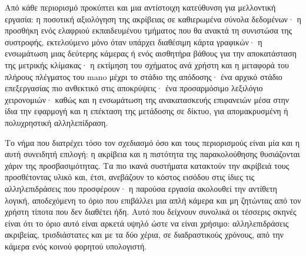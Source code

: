 Από κάθε περιορισμό προκύπτει και μια αντίστοιχη κατεύθυνση για μελλοντική
εργασία: η ποσοτική αξιολόγηση της ακρίβειας σε καθιερωμένα σύνολα δεδομένων· η
προσθήκη ενός ελαφριού εκπαιδευμένου τμήματος που θα ανακτά τη συνιστώσα της
συστροφής, εκτελούμενο μόνο όταν υπάρχει διαθέσιμη κάρτα γραφικών· η ενσωμάτωση
μιας δεύτερης κάμερας ή ενός αισθητήρα βάθους για την αποκατάσταση της μετρικής
κλίμακας· η εκτίμηση του σχήματος ανά χρήστη και η μεταφορά του πλήρους
πλέγματος του \acrshort{mano} μέχρι το στάδιο της απόδοσης· ένα αρχικό στάδιο
επεξεργασίας πιο ανθεκτικό στις αποκρύψεις· ένα προσαρμόσιμο λεξιλόγιο
χειρονομιών· καθώς και η ενσωμάτωση της ανακατασκευής επιφανειών μέσα στην ίδια
την εφαρμογή και η επέκταση της μετάδοσης σε δίκτυο, για απομακρυσμένη ή
πολυχρηστική αλληλεπίδραση.

Το νήμα που διατρέχει τόσο τον σχεδιασμό όσο και τους περιορισμούς είναι μία
και η αυτή συνειδητή επιλογή: η ακρίβεια και η πιστότητα της παρακολούθησης
θυσιάζονται χάριν της προσβασιμότητας. Τα πιο ικανά συστήματα κατακτούν την
ακρίβειά τους προσθέτοντας υλικό και, έτσι, ανεβάζουν το κόστος εισόδου στις
ίδιες τις αλληλεπιδράσεις που προσφέρουν· η παρούσα εργασία ακολουθεί την
αντίθετη λογική, αποδεχόμενη το όριο που επιβάλλει μια απλή κάμερα και μη
ζητώντας από τον χρήστη τίποτα που δεν διαθέτει ήδη. Αυτό που δείχνουν συνολικά
οι τέσσερις σκηνές είναι ότι το όριο αυτό είναι αρκετά υψηλό ώστε να είναι
χρήσιμο: αλληλεπιδράσεις ακριβείας, τρισδιάστατες και με τα δύο χέρια, σε
διαδραστικούς χρόνους, από την κάμερα ενός κοινού φορητού υπολογιστή.
